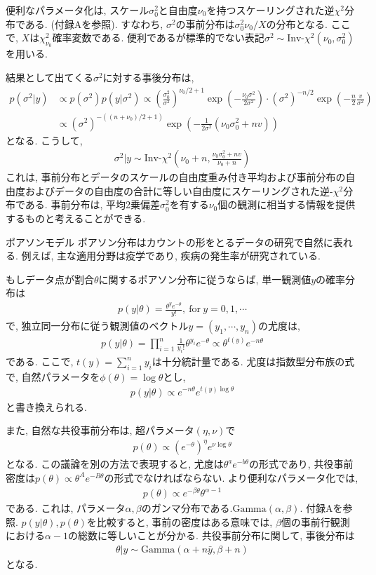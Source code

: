 \documentclass[10pt,dvipdfmx,a4]{beamer}
\newcommand{\eqn}[1]{\begin{align*}#1\end{align*}}
\begin{document}

\begin{frame}
便利なパラメータ化は, スケール$\sigma_0^2$と自由度$\nu_0$を持つスケーリングされた逆$\chi^2$分布である.
(付録Aを参照).
すなわち, $\sigma^2$の事前分布は$\sigma_0^2 \nu_0 / X$の分布となる.
ここで, $X$は$\chi_{\nu_0}^2$確率変数である.
便利であるが標準的でない表記$\sigma^2\sim \text{Inv-}\chi^2(\nu_0,\sigma_0^2)$を用いる.

結果として出てくる$\sigma^2$に対する事後分布は,
\eqn{p(\sigma^2|y)&\propto p(\sigma^2)p(y|\sigma^2)
\propto \left(\frac{\sigma_0^2}{\sigma^2}\right)^{\nu_0/2+1} \exp\left(-\frac{\nu_0\sigma^2}{2\sigma^2}\right)\cdot (\sigma^2)^{-n/2}\exp \left(-\frac{n}{2}\frac{v}{\sigma^2}\right)\\
&\propto (\sigma^2)^{-((n+\nu_0)/2+1)} \exp\left(-\frac{1}{2\sigma^2} (\nu_0\sigma_0^2+nv)\right)}
となる.
こうして,
\eqn{\sigma^2|y\sim \text{Inv-}\chi^2\left(\nu_0+n,\frac{\nu_0\sigma_0^2+nv}{\nu_0+n}\right)}
これは, 事前分布とデータのスケールの自由度重み付き平均および事前分布の自由度およびデータの自由度の合計に等しい自由度にスケーリングされた逆-$\chi^2$分布である.
事前分布は, 平均2乗偏差$\sigma^2_0$を有する$\nu_0$個の観測に相当する情報を提供するものと考えることができる.
\end{frame}


\begin{frame}{ポアソンモデル}
ポアソン分布はカウントの形をとるデータの研究で自然に表れる.
例えば, 主な適用分野は疫学であり, 疾病の発生率が研究されている.

もしデータ点が割合$\theta$に関するポアソン分布に従うならば, 単一観測値$y$の確率分布は
\eqn{p(y|\theta)=\frac{\theta^ye^{-\theta}}{y!},\ \text{for}\ y=0,1,\cdots}
で, 独立同一分布に従う観測値のベクトル$y=(y_1,\cdots,y_n)$の尤度は,
\eqn{p(y|\theta)=\prod_{i=1}^n\frac{1}{y_i!}\theta^{y_i}e^{-\theta}\propto \theta^{t(y)}e^{-n\theta}}
である.
ここで, $t(y)=\sum_{i=1}^n y_i$は十分統計量である.
尤度は指数型分布族の式で, 自然パラメータを$\phi(\theta)=\log \theta$とし,
\eqn{p(y|\theta)\propto e^{-n\theta}e^{t(y)\log \theta}}
と書き換えられる.
\end{frame}


\begin{frame}
また, 自然な共役事前分布は, 超パラメータ$(\eta,\nu)$で
\eqn{p(\theta)\propto (e^{-\theta})^{\eta}e^{\nu \log \theta}}
となる.
この議論を別の方法で表現すると, 尤度は$\theta^ae^{-b\theta}$の形式であり, 共役事前密度は$p(\theta)\propto\theta^Ae^{-B \theta}$の形式でなければならない.
より便利なパラメータ化では,
\eqn{p(\theta)\propto e^{-\beta\theta}\theta^{\alpha-1}}
である.
これは, パラメータ$\alpha, \beta$のガンマ分布である.$\text{Gamma}(\alpha,\beta)$.
付録Aを参照.
$p(y|\theta), p(\theta)$を比較すると, 事前の密度はある意味では, $\beta$個の事前行観測における$\alpha-1$の総数に等しいことが分かる.
共役事前分布に関して, 事後分布は
\eqn{\theta|y\sim \text{Gamma}(\alpha+n\bar{y},\beta+n)}
となる.
\end{frame}
\end{document}
